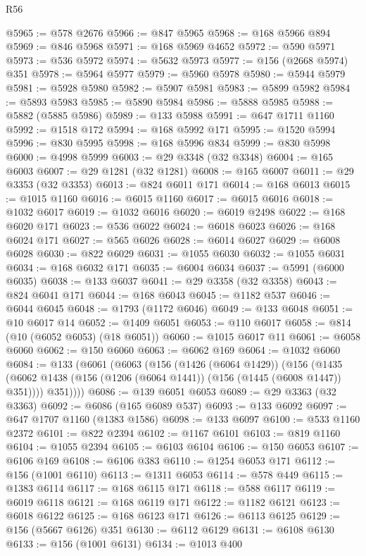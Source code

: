\begin{lexlean}{R56}
\begin{coremodule}
{{{{{{{{{{{{{{{{{{{{{{{{{{{{{{{{{{{{{{{{{{{{{{{{{{{{{{{{{{{{{{{{{{{{{{{{{{{{{{{{{{{{{{{{{{{{{{{{{{{{{{{{{{{{{{{{{{{{{{{{{{{{{{{{{{{{{{{{{{{{{{{{{{{{{{{{{{{{{{{{{{{{{{{{{{{{{{{{{{{{{{{{{{{{{{{{{{{{{{{{{{{{{{{{{{{@5965 := @578 @2676
@5966 := @847 @5965
@5968 := @168 @5966 @894
@5969 := @846 @5968
@5971 := @168 @5969 @4652
@5972 := @590 @5971
@5973 := @536 @5972
@5974 := @5632 @5973
@5977 := @156 (@2668 @5974) @351
@5978 := @5964 @5977
@5979 := @5960 @5978
@5980 := @5944 @5979
@5981 := @5928 @5980
@5982 := @5907 @5981
@5983 := @5899 @5982
@5984 := @5893 @5983
@5985 := @5890 @5984
@5986 := @5888 @5985
@5988 := @5882 (@5885 @5986)
@5989 := @133 @5988
@5991 := @647 @1711 @1160
@5992 := @1518 @172
@5994 := @168 @5992 @171
@5995 := @1520 @5994
@5996 := @830 @5995
@5998 := @168 @5996 @834
@5999 := @830 @5998
@6000 := @4998 @5999
@6003 := @29 @3348 (@32 @3348)
@6004 := @165 @6003
@6007 := @29 @1281 (@32 @1281)
@6008 := @165 @6007
@6011 := @29 @3353 (@32 @3353)
@6013 := @824 @6011 @171
@6014 := @168 @6013
@6015 := @1015 @1160
@6016 := @6015 @1160
@6017 := @6015 @6016
@6018 := @1032 @6017
@6019 := @1032 @6016
@6020 := @6019 @2498
@6022 := @168 @6020 @171
@6023 := @536 @6022
@6024 := @6018 @6023
@6026 := @168 @6024 @171
@6027 := @565 @6026
@6028 := @6014 @6027
@6029 := @6008 @6028
@6030 := @822 @6029
@6031 := @1055 @6030
@6032 := @1055 @6031
@6034 := @168 @6032 @171
@6035 := @6004 @6034
@6037 := @5991 (@6000 @6035)
@6038 := @133 @6037
@6041 := @29 @3358 (@32 @3358)
@6043 := @824 @6041 @171
@6044 := @168 @6043
@6045 := @1182 @537
@6046 := @6044 @6045
@6048 := @1793 (@1172 @6046)
@6049 := @133 @6048
@6051 := @10 @6017 @14
@6052 := @1409 @6051
@6053 := @110 @6017
@6058 := @814 (@10 (@6052 @6053) (@18 @6051))
@6060 := @1015 @6017 @11
@6061 := @6058 @6060
@6062 := @150 @6060
@6063 := @6062 @169
@6064 := @1032 @6060
@6084 := @133
    (@6061
      (@6063
        (@156
          (@1426 (@6064 @1429))
          (@156
            (@1435 (@6062 @1438 (@156 (@1206 (@6064 @1441)) (@156 (@1445 (@6008 @1447)) @351))))
            @351))))
@6086 := @139 @6051 @6053
@6089 := @29 @3363 (@32 @3363)
@6092 := @6086 (@165 @6089 @537)
@6093 := @133 @6092
@6097 := @647 @1707 @1160 (@1383 @1586)
@6098 := @133 @6097
@6100 := @533 @1160 @2372
@6101 := @822 @2394
@6102 := @1167 @6101
@6103 := @819 @1160
@6104 := @1055 @2394
@6105 := @6103 @6104
@6106 := @150 @6053
@6107 := @6106 @169
@6108 := @6106 @383
@6110 := @1254 @6053 @171
@6112 := @156 (@1001 @6110)
@6113 := @1311 @6053
@6114 := @578 @449
@6115 := @1383 @6114
@6117 := @168 @6115 @171
@6118 := @588 @6117
@6119 := @6019 @6118
@6121 := @168 @6119 @171
@6122 := @1182 @6121
@6123 := @6018 @6122
@6125 := @168 @6123 @171
@6126 := @6113 @6125
@6129 := @156 (@5667 @6126) @351
@6130 := @6112 @6129
@6131 := @6108 @6130
@6133 := @156 (@1001 @6131)
@6134 := @1013 @400
}}}}}}}}}}}}}}}}}}}}}}}}}}}}}}}}}}}}}}}}}}}}}}}}}}}}}}}}}}}}}}}}}}}}}}}}}}}}}}}}}}}}}}}}}}}}}}}}}}}}}}}}}}}}}}}}}}}}}}}}}}}}}}}}}}}}}}}}}}}}}}}}}}}}}}}}}}}}}}}}}}}}}}}}}}}}}}}}}}}}}}}}}}}}}}}}}}}}}}}}}}}}}}}}}}}
\end{coremodule}
\end{lexlean}
